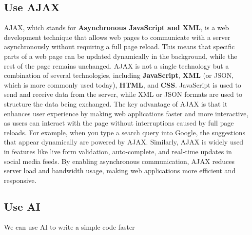 \documentclass[11pt]{article}
\begin{document}
    \subsection{Use AJAX}\label{use-ajax}

AJAX, which stands for \textbf{Asynchronous JavaScript and XML}, is a
web development technique that allows web pages to communicate with a
server asynchronously without requiring a full page reload. This means
that specific parts of a web page can be updated dynamically in the
background, while the rest of the page remains unchanged. AJAX is not a
single technology but a combination of several technologies, including
\textbf{JavaScript}, \textbf{XML} (or JSON, which is more commonly used
today), \textbf{HTML}, and \textbf{CSS}. JavaScript is used to send and
receive data from the server, while XML or JSON formats are used to
structure the data being exchanged. The key advantage of AJAX is that it
enhances user experience by making web applications faster and more
interactive, as users can interact with the page without interruptions
caused by full page reloads. For example, when you type a search query
into Google, the suggestions that appear dynamically are powered by
AJAX. Similarly, AJAX is widely used in features like live form
validation, auto-complete, and real-time updates in social media feeds.
By enabling asynchronous communication, AJAX reduces server load and
bandwidth usage, making web applications more efficient and responsive.

\subsection{Use AI}\label{use-ai}

We can use AI to write a simple code faster
\end{document}
